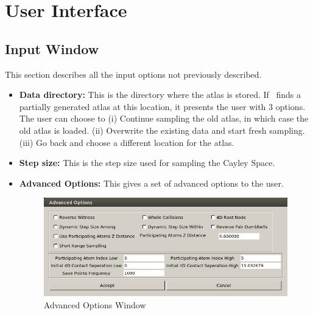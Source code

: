 \documentclass[10pt]{article}
\begin{document}
\section{User Interface}
\subsection{Input Window}
This section describes all the input options not previously described.

\begin{itemize}

\item \textbf{Data directory:} This is the directory where the atlas is stored.
		If \EASAL~finds a partially generated atlas at this location, it
		presents the user with 3 options. The user can choose to (i) Continue
		sampling the old atlas, in which case the old atlas is loaded. (ii)
		Overwrite the existing data and start fresh sampling. (iii) Go back and
		choose a different location for the atlas.

\item \textbf{Step size:} This is the step size used for sampling the Cayley
		Space.

\item \textbf{Advanced Options:} This gives a set of advanced options to the
		user.

\begin{figure}[h]
\centering
\includegraphics[scale=0.5] {fig/AdvancedOptions.png}
\caption{Advanced Options Window}
\label{Input}
\end{figure}


\end{itemize}
\end{document}
